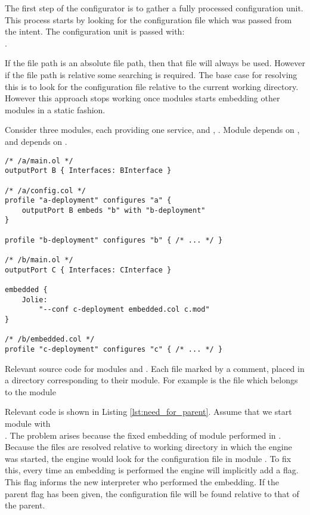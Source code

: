 The first step of the configurator is to gather a fully processed configuration
unit. This process starts by looking for the configuration file which was
passed from the intent. The configuration unit is passed with:
\\.

If the file path is an absolute file path, then that file will always be used.
However if the file path is relative some searching is required. The base case
for resolving this is to look for the configuration file relative to the
current working directory. However this approach stops working once modules starts
embedding other modules in a static fashion.

Consider three modules, each providing one service,  and ,
. Module  depends on , and  depends on
.

\begin{listing}[H]
\begin{verbatim}
/* /a/main.ol */
outputPort B { Interfaces: BInterface }

/* /a/config.col */
profile "a-deployment" configures "a" {
    outputPort B embeds "b" with "b-deployment"
}

profile "b-deployment" configures "b" { /* ... */ }

/* /b/main.ol */
outputPort C { Interfaces: CInterface }

embedded {
    Jolie:
        "--conf c-deployment embedded.col c.mod"
}

/* /b/embedded.col */
profile "c-deployment" configures "c" { /* ... */ }
\end{verbatim}

\caption{Relevant source code for modules  and . Each file
    marked by a comment, placed in a directory corresponding to their module.
        For example  is the  file which belongs
        to the module }

\label{lst:need_for_parent}

\end{listing}

Relevant code is shown in Listing \ref{lst:need_for_parent}.  Assume that we
start module  with \\.  The
problem arises because the fixed embedding of module  performed in
. Because the files are resolved relative to working directory in which
the engine was started, the engine would look for the configuration file in
module . To fix this, every time an embedding is performed the engine
will implicitly add a  flag. This flag informs the new
interpreter who performed the embedding. If the parent flag has
been given, the configuration file will be found relative to that of the
parent.

